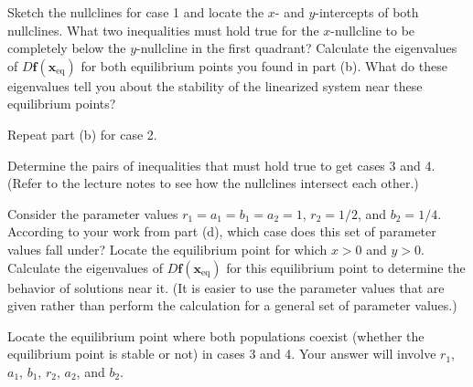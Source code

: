 \documentclass[boxes]{gsypset}
\begin{document}
\begin{problem}
\begin{subproblems}
\begin{solution}
				\end{solution}
			\subproblem 
				Sketch the nullclines for case 1 and locate the $x$- and $y$-intercepts of both nullclines.  
				What two inequalities must hold true for the $x$-nullcline to be 
				completely below the $y$-nullcline in the first quadrant?  
				Calculate the eigenvalues of $D\mathbf{f}(\mathbf{x}_{\text{eq}})$ 
				for both equilibrium points you found in part (b). 
				What do these eigenvalues tell you about the stability of the linearized system 
				near these equilibrium points?
				\begin{solution}
					
				\end{solution}
			\subproblem Repeat part (b) for case 2.
				\begin{solution}
					
				\end{solution}
			\subproblem 
				Determine the pairs of inequalities that must hold true to get cases 3 and 4. 
				(Refer to the lecture notes to see how the nullclines intersect each other.)
				\begin{solution}
					
				\end{solution}
			\subproblem 
				Consider the parameter values $r_1=a_1=b_1=a_2=1$, $r_2=1/2$, and $b_2=1/4$. 
				According to your work from part (d), 
				which case does this set of parameter values fall under? 
				Locate the equilibrium point for which $x>0$ and $y>0$. 
				Calculate the eigenvalues of $D\mathbf{f}(\mathbf{x}_{\text{eq}})$ for this equilibrium point 
				to determine the behavior of solutions near it. 
				(It is easier to use the parameter values that are given 
				rather than perform the calculation for a general set of parameter values.)
				\begin{solution}
					
				\end{solution}
			\subproblem 
				Locate the equilibrium point where both populations coexist 
				(whether the equilibrium point is stable or not) in cases 3 and 4. 
				Your answer will involve $r_1$, $a_1$, $b_1$, $r_2$, $a_2$, and $b_2$.
				\begin{solution}
					
				\end{solution}
		\end{subproblems}
	\end{problem}
\end{document}
